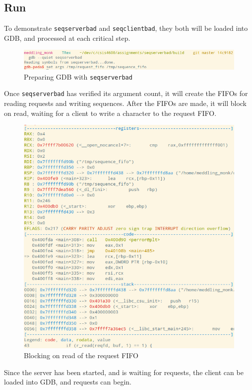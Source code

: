 \documentclass[letter,12pt,sffamily]{article}
\begin{document}
\subsection{Run}
To demonstrate \texttt{seqserverbad} and \texttt{seqclientbad}, they both will be loaded into GDB, and processed at each critical step.
\begin{figure}[H]
	\centering
	\includegraphics[width=1\linewidth]{./images/24}
	\caption[preparing_gdb_seqserver]{Preparing GDB with \texttt{seqserverbad}}
	\label{fig:28}
\end{figure}
Once \texttt{seqserverbad} has verified its argument count, it will create the FIFOs for reading requests and writing sequences.
After the FIFOs are made, it will block on read, waiting for a client to write a character to the request FIFO.
\begin{figure}[H]
	\centering
	\includegraphics[width=1\linewidth]{./images/25}
	\caption[read_request_fifo]{Blocking on read of the request FIFO}
	\label{fig:29}
\end{figure}
Since the server has been started, and is waiting for requests, the client can be loaded into GDB, and requests can begin.
\end{document}
